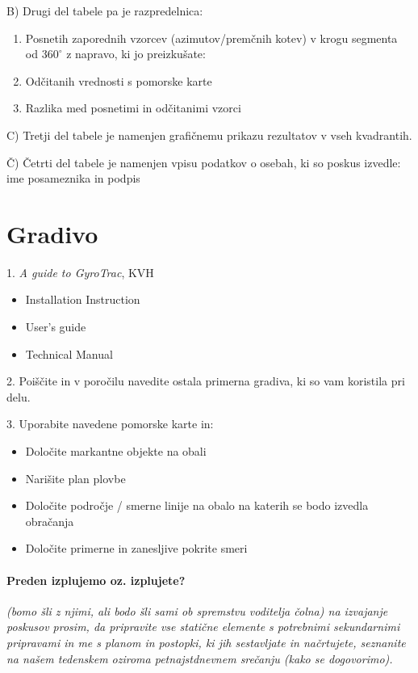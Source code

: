 \flushleft B) Drugi del tabele pa je razpredelnica:

\begin{enumerate}
	\item	Posnetih zaporednih vzorcev (azimutov/premčnih kotev) v krogu segmenta od $360^\circ$ z napravo, ki jo preizkušate:
	\item	Odčitanih vrednosti s pomorske karte
	\item	Razlika med posnetimi in odčitanimi vzorci
\end{enumerate}

\flushleft C) Tretji del tabele je namenjen grafičnemu prikazu rezultatov v vseh kvadrantih.

\flushleft Č) Četrti del tabele je namenjen vpisu podatkov o osebah, ki so poskus izvedle: ime posameznika in podpis


\section{Gradivo}
\label{sec:VrtKompas_Grad}

 1. \textit{A guide to GyroTrac}, KVH
 \begin{itemize}
 \item Installation Instruction
 \item User’s guide
 \item Technical Manual
 \end{itemize}
 
 2. Poiščite in v poročilu navedite ostala primerna gradiva, ki so vam koristila pri delu.
 
 3. Uporabite navedene pomorske karte in:
 \begin{itemize}
 \item	Določite markantne objekte na obali
 \item	Narišite plan plovbe
 \item	Določite področje / smerne linije na obalo na katerih se bodo izvedla obračanja
 \item	Določite primerne in zanesljive pokrite smeri
 \end{itemize}


\paragraph{\textbf{Preden izplujemo oz. izplujete?}}
\textit{ (bomo šli z njimi, ali bodo šli sami ob spremstvu voditelja čolna) na izvajanje poskusov prosim, da pripravite vse statične elemente s potrebnimi  sekundarnimi pripravami in me s planom in postopki, ki jih sestavljate in načrtujete, seznanite na našem tedenskem oziroma petnajstdnevnem srečanju (kako se dogovorimo).}




%
